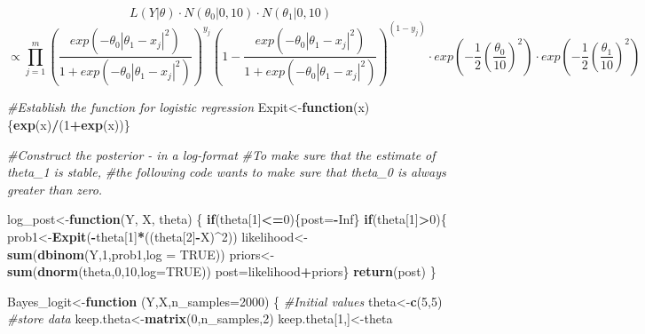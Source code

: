 \documentclass[]{book}
\newenvironment{Shaded}{\begin{snugshade}}{\end{snugshade}}
\newcommand{\CommentTok}[1]{\textcolor[rgb]{0.56,0.35,0.01}{\textit{#1}}}
\newcommand{\ControlFlowTok}[1]{\textcolor[rgb]{0.13,0.29,0.53}{\textbf{#1}}}
\newcommand{\DataTypeTok}[1]{\textcolor[rgb]{0.13,0.29,0.53}{#1}}
\newcommand{\DecValTok}[1]{\textcolor[rgb]{0.00,0.00,0.81}{#1}}
\newcommand{\KeywordTok}[1]{\textcolor[rgb]{0.13,0.29,0.53}{\textbf{#1}}}
\newcommand{\NormalTok}[1]{#1}
\newcommand{\OperatorTok}[1]{\textcolor[rgb]{0.81,0.36,0.00}{\textbf{#1}}}
\newcommand{\OtherTok}[1]{\textcolor[rgb]{0.56,0.35,0.01}{#1}}
\begin{document}
\[L(Y|\theta) \cdot N(\theta_0|0,10) \cdot N(\theta_1|0,10)\]
\[\propto \prod_{j=1}^{m} (\frac{exp(- \theta_0|\theta_1 - x_j|^2)}{1+exp(- \theta_0|\theta_1 - x_j|^2)})^{y_j}(1-\frac{exp(- \theta_0|\theta_1 - x_j|^2)}{1+exp(- \theta_0|\theta_1 - x_j|^2)})^{(1-y_j)}\cdot exp(-\frac{1}{2}(\frac{\theta_0}{10})^2)\cdot exp(-\frac{1}{2}(\frac{\theta_1}{10})^2)\]

\begin{Shaded}
\begin{Highlighting}[]
\CommentTok{#Establish the function for logistic regression}
\NormalTok{Expit<-}\ControlFlowTok{function}\NormalTok{(x)\{}\KeywordTok{exp}\NormalTok{(x)}\OperatorTok{/}\NormalTok{(}\DecValTok{1}\OperatorTok{+}\KeywordTok{exp}\NormalTok{(x))\}}

\CommentTok{#Construct the posterior - in a log-format}
\CommentTok{#To make sure that the estimate of theta_1 is stable, }
\CommentTok{#the following code wants to make sure that theta_0 is always greater than zero.}

\NormalTok{log_post<-}\ControlFlowTok{function}\NormalTok{(Y, X, theta)}
\NormalTok{  \{}
  \ControlFlowTok{if}\NormalTok{(theta[}\DecValTok{1}\NormalTok{]}\OperatorTok{<=}\DecValTok{0}\NormalTok{)\{post=}\OperatorTok{-}\OtherTok{Inf}\NormalTok{\}}
  \ControlFlowTok{if}\NormalTok{(theta[}\DecValTok{1}\NormalTok{]}\OperatorTok{>}\DecValTok{0}\NormalTok{)\{}
\NormalTok{  prob1<-}\KeywordTok{Expit}\NormalTok{(}\OperatorTok{-}\NormalTok{theta[}\DecValTok{1}\NormalTok{]}\OperatorTok{*}\NormalTok{((theta[}\DecValTok{2}\NormalTok{]}\OperatorTok{-}\NormalTok{X)}\OperatorTok{^}\DecValTok{2}\NormalTok{))}
\NormalTok{  likelihood<-}\KeywordTok{sum}\NormalTok{(}\KeywordTok{dbinom}\NormalTok{(Y,}\DecValTok{1}\NormalTok{,prob1,}\DataTypeTok{log =} \OtherTok{TRUE}\NormalTok{))}
\NormalTok{  priors<-}\KeywordTok{sum}\NormalTok{(}\KeywordTok{dnorm}\NormalTok{(theta,}\DecValTok{0}\NormalTok{,}\DecValTok{10}\NormalTok{,}\DataTypeTok{log=}\OtherTok{TRUE}\NormalTok{))}
\NormalTok{  post=likelihood}\OperatorTok{+}\NormalTok{priors\}}
  \KeywordTok{return}\NormalTok{(post)}
\NormalTok{   \}}

\NormalTok{Bayes_logit<-}\ControlFlowTok{function}\NormalTok{ (Y,X,}\DataTypeTok{n_samples=}\DecValTok{2000}\NormalTok{)}
\NormalTok{\{}
\CommentTok{#Initial values}
\NormalTok{  theta<-}\KeywordTok{c}\NormalTok{(}\DecValTok{5}\NormalTok{,}\DecValTok{5}\NormalTok{)}
\CommentTok{#store data}
\NormalTok{  keep.theta<-}\KeywordTok{matrix}\NormalTok{(}\DecValTok{0}\NormalTok{,n_samples,}\DecValTok{2}\NormalTok{)}
\NormalTok{  keep.theta[}\DecValTok{1}\NormalTok{,]<-theta}
  

\end{Highlighting}
\end{Shaded}
\end{document}
